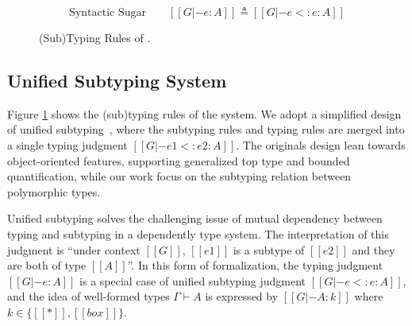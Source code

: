 \begin{figure}
    \begin{equation*}
       \text{Syntactic Sugar} \qquad [[G |- e : A]] \triangleq [[G |- e <: e : A]]
    \end{equation*}
    \caption{(Sub)Typing Rules of \name.}
    \label{fig:typing}
\end{figure}

\subsection{Unified Subtyping System}
\label{sec:type-system}

Figure \ref{fig:typing} shows the (sub)typing rules of the system. We adopt a
simplified design of unified subtyping~\cite{yang2017unifying}, where the subtyping rules and
typing rules are merged into a single typing judgment $[[G |- e1 <: e2 : A]]$.
The originals design lean towards object-oriented features,
supporting generalized top type and bounded quantification,
while our work focus on the subtyping relation between polymorphic types.

Unified subtyping solves the challenging issue of mutual dependency between typing
and subtyping in a dependently type system.
The interpretation of this judgment is ``under context $[[G]]$, $[[e1]]$ is a
subtype of $[[e2]]$ and they are both of type $[[A]]$''.
In this form of formalization, the typing judgment $[[G |- e : A]]$ is a
special case of unified subtyping judgment $[[G |- e <: e : A]]$,
and the idea of well-formed types $\Gamma \vdash A$ is expressed by
$[[G |- A : k]]$ where $k \in \{[[*]], [[box]]\}$.

